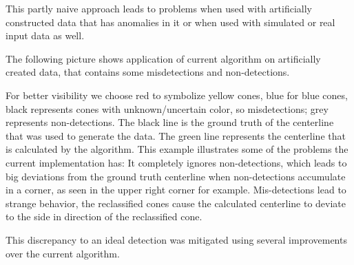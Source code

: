 This partly naive approach leads to problems when used with artificially constructed data that has anomalies in it or when used with simulated or real input data as well.

The following picture shows application of current algorithm on artificially created data, that contains some misdetections and non-detections.

For better visibility we choose red to symbolize yellow cones, blue for blue cones, black represents cones with unknown/uncertain color, so misdetections; grey represents non-detections. The black line is the ground truth of the centerline that was used to generate the data. The green line represents the centerline that is calculated by the algorithm. This example illustrates some of the problems the current implementation has: It completely ignores non-detections, which leads to big deviations from the ground truth centerline when non-detections accumulate in a corner, as seen in the upper right corner for example. Mis-detections lead to strange behavior, the reclassified cones cause the calculated centerline to deviate to the side in direction of the reclassified cone.


This discrepancy to an ideal detection was mitigated using several improvements over the current algorithm.

